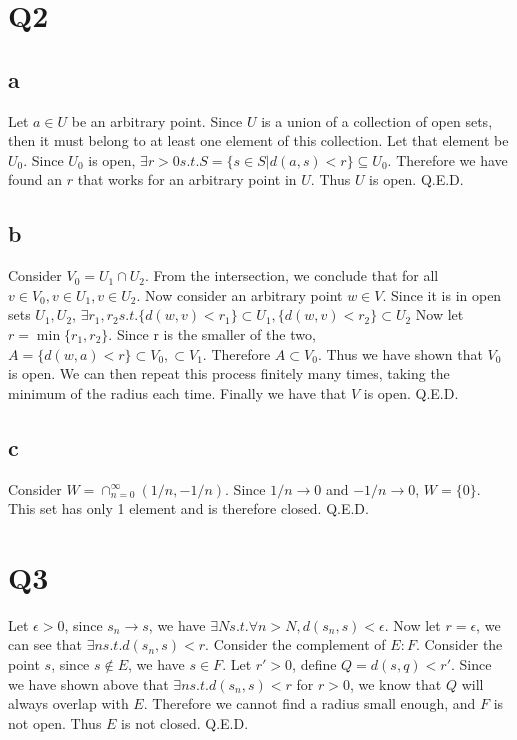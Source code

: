 \documentclass[12pt]{article}
\begin{document}
\section{Q2}
\subsection{a}
Let $a \in U$ be an arbitrary point. Since $U$ is a union of a collection of open sets, then it must belong to at least one element of this collection. Let that element be $U_0$.
\newline
Since $U_0$ is open, $\exists r>0 s.t. S=\{s \in S | d(a,s)<r\} \subseteq U_0$. Therefore we have found an $r$ that works for an arbitrary point in $U$. Thus $U$ is open. Q.E.D.

\subsection{b}
Consider $V_0 = U_1 \cap U_2$.
\newline
From the intersection, we conclude that for all $v \in V_0, v \in U_1, v \in U_2$. Now consider an arbitrary point $w \in V$. Since it is in open sets $U_1, U_2$, $\exists r_1, r_2 s.t. \{d(w,v)<r_1\} \subset U_1, \{d(w,v)<r_2\} \subset U_2$
\newline
Now let $r = \min \{r_1, r_2\}$. Since r is the smaller of the two, $A = \{d(w, a)<r \} \subset V_0, \subset V_1$. Therefore $A \subset V_0$. Thus we have shown that $V_0$ is open.
\newline
We can then repeat this process finitely many times, taking the minimum of the radius each time. Finally we have that $V$ is open. Q.E.D.

\subsection{c}
Consider $W = \cap ^\infty _{n=0} (1/n, -1/n)$. Since $1/n \to 0$ and $-1/n \to 0$, $W = \{0\}$. This set has only 1 element and is therefore closed. Q.E.D.
\newpage


\section{Q3}
Let $\epsilon > 0$, since $s_n \to s$, we have $\exists N s.t. \forall n>N, d(s_n,s)<\epsilon$. Now let $r = \epsilon$, we can see that $\exists n s.t. d(s_n, s)<r$.
\newline
Consider the complement of $E: F$. Consider the point $s$, since $s \notin E$, we have $s \in F$. Let $r' > 0$, define $Q = d(s,q)<r'$. Since we have shown above that $\exists n s.t. d(s_n, s)<r$ for $r>0$, we know that $Q$ will always overlap with $E$. Therefore we cannot find a radius small enough, and $F$ is not open. Thus $E$ is not closed. Q.E.D.
\end{document}
